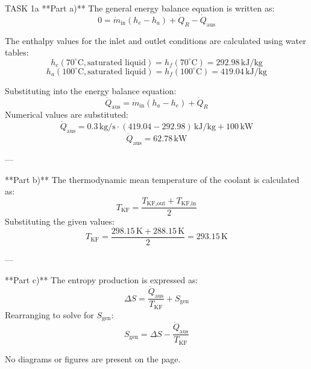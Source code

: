 TASK 1a  
**Part a)**  
The general energy balance equation is written as:  
\[
0 = \dot{m}_{\text{in}} (h_e - h_a) + \dot{Q}_R - \dot{Q}_{\text{aus}}
\]  

The enthalpy values for the inlet and outlet conditions are calculated using water tables:  
\[
h_e(70^\circ\text{C}, \text{saturated liquid}) = h_f(70^\circ\text{C}) = 292.98 \, \text{kJ/kg}
\]  
\[
h_a(100^\circ\text{C}, \text{saturated liquid}) = h_f(100^\circ\text{C}) = 419.04 \, \text{kJ/kg}
\]  

Substituting into the energy balance equation:  
\[
\dot{Q}_{\text{aus}} = \dot{m}_{\text{in}} (h_a - h_e) + \dot{Q}_R
\]  
Numerical values are substituted:  
\[
\dot{Q}_{\text{aus}} = 0.3 \, \text{kg/s} \cdot (419.04 - 292.98) \, \text{kJ/kg} + 100 \, \text{kW}
\]  
\[
\dot{Q}_{\text{aus}} = 62.78 \, \text{kW}
\]  

---

**Part b)**  
The thermodynamic mean temperature of the coolant is calculated as:  
\[
T_{\text{KF}} = \frac{T_{\text{KF,out}} + T_{\text{KF,in}}}{2}
\]  
Substituting the given values:  
\[
T_{\text{KF}} = \frac{298.15 \, \text{K} + 288.15 \, \text{K}}{2} = 293.15 \, \text{K}
\]  

---

**Part c)**  
The entropy production is expressed as:  
\[
\Delta S = \frac{\dot{Q}_{\text{aus}}}{T_{\text{KF}}} + S_{\text{gen}}
\]  
Rearranging to solve for \( S_{\text{gen}} \):  
\[
S_{\text{gen}} = \Delta S - \frac{\dot{Q}_{\text{aus}}}{T_{\text{KF}}}
\]  

No diagrams or figures are present on the page.